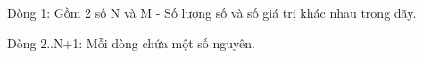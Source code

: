 Dòng 1: Gồm 2 số N và M - Số lượng số và số giá trị khác nhau trong dãy.

Dòng 2..N+1: Mỗi dòng chứa một số nguyên.